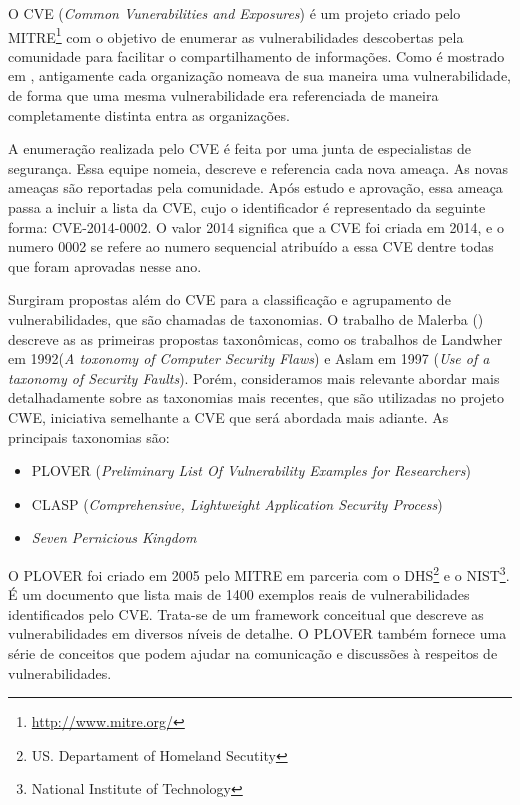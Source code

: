 %

O CVE (\emph{Common Vunerabilities and Exposures}) é um projeto criado pelo MITRE\footnote{\url{http://www.mitre.org/}} com o objetivo de enumerar as vulnerabilidades descobertas pela comunidade para facilitar o compartilhamento de informações. Como é mostrado em \cite{cve2001martin}, antigamente cada organização nomeava de sua maneira uma vulnerabilidade, de forma que uma mesma vulnerabilidade era referenciada de maneira completamente distinta entra as organizações. 

%

A enumeração realizada pelo CVE é feita por uma junta de especialistas 	de segurança. Essa equipe nomeia, descreve e referencia cada nova ameaça. As novas ameaças são reportadas pela comunidade. Após estudo e aprovação, essa ameaça passa a incluir a lista da CVE, cujo o identificador é representado da seguinte forma: CVE-2014-0002. O valor 2014 significa que a CVE foi criada em 2014, e o numero 0002 se refere ao numero sequencial atribuído a essa CVE dentre todas que foram aprovadas nesse ano.

%

Surgiram propostas além do CVE para a classificação e agrupamento de vulnerabilidades, que são chamadas de taxonomias. O trabalho de Malerba (\citeyear{malerba2010}) descreve as as primeiras propostas taxonômicas, como os trabalhos de Landwher em 1992(\emph{A toxonomy of Computer Security Flaws}) e Aslam em 1997 (\emph{Use of  a taxonomy of Security Faults}). Porém, consideramos mais relevante abordar mais detalhadamente sobre as taxonomias mais recentes, que são utilizadas no projeto CWE, iniciativa semelhante a CVE que será abordada mais adiante. As principais taxonomias são:

%

\begin{itemize}
\item PLOVER (\emph{Preliminary List Of Vulnerability Examples for Researchers})
\item CLASP (\emph{Comprehensive, Lightweight Application Security Process})
\item \emph{Seven Pernicious Kingdom}
\end{itemize}

%

O PLOVER foi criado em 2005 pelo MITRE em parceria com o DHS\footnote{US. Departament of Homeland Secutity} e o NIST\footnote{National Institute of Technology}. É um documento que lista mais de 1400 exemplos reais de vulnerabilidades identificados pelo CVE. Trata-se de um framework conceitual que descreve as vulnerabilidades em diversos níveis de detalhe. O PLOVER também fornece uma série de conceitos que podem ajudar na comunicação e discussões à respeitos de vulnerabilidades.

